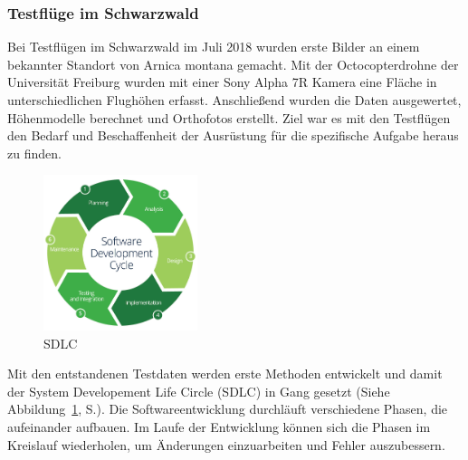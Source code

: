 \subsubsection{Testflüge im Schwarzwald}

Bei Testflügen im Schwarzwald im Juli 2018 wurden erste Bilder an einem bekannter Standort von Arnica montana gemacht. Mit der Octocopterdrohne der Universität Freiburg wurden mit einer Sony Alpha 7R Kamera eine Fläche in unterschiedlichen Flughöhen erfasst. Anschließend wurden die Daten ausgewertet, Höhenmodelle berechnet und Orthofotos erstellt. Ziel war es mit den Testflügen den Bedarf und Beschaffenheit der Ausrüstung für die spezifische Aufgabe heraus zu finden.

\begin{figure}
  \vspace{-20pt}
  \begin{center}
    \includegraphics[width=0.4\textwidth]{abb/SDLC}
  \end{center}
  \vspace{-20pt}
  \caption{SDLC}
  \label{fig:sdlc}
  \vspace{-20pt}
\end{figure}
Mit den entstandenen Testdaten werden erste Methoden entwickelt und damit der System Developement Life Circle (SDLC) in Gang gesetzt (Siehe Abbildung~\ref{fig:sdlc}, S.\pageref{fig:sdlc}). Die Softwareentwicklung durchläuft verschiedene Phasen, die aufeinander aufbauen. Im Laufe der Entwicklung können sich die Phasen im Kreislauf wiederholen, um Änderungen einzuarbeiten und Fehler auszubessern. 




